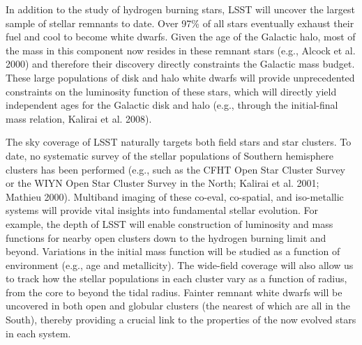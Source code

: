 \documentclass{emulateapj}
\begin{document}
In addition to the study of hydrogen burning stars, LSST will uncover the largest 
sample of stellar remnants to date. Over 97\% of all stars eventually exhaust their 
fuel and cool to become white dwarfs. Given the age of the Galactic halo, most of 
the mass in this component now resides in these remnant stars (e.g., Alcock et al. 
2000) and therefore their discovery directly constraints the Galactic mass budget.  
These large populations of disk and halo white dwarfs will provide unprecedented 
constraints on the luminosity function of these stars, which will directly yield 
independent ages for the Galactic disk and halo (e.g., through the initial-final mass 
relation, Kalirai et al. 2008).

The sky coverage of LSST naturally targets both field stars and star clusters.  
To date, no systematic survey of the stellar populations of Southern hemisphere clusters 
has been performed (e.g., such as the CFHT Open Star Cluster Survey or the WIYN Open 
Star Cluster Survey in the North; Kalirai et al. 2001; Mathieu 2000).  
Multiband imaging of these co-eval, co-spatial, and iso-metallic systems will provide 
vital insights into fundamental stellar evolution.  For example, the depth of 
LSST will enable construction of  luminosity and mass functions for nearby open clusters 
down to the hydrogen burning limit and beyond.  Variations in the initial mass function will be 
studied as a function of environment (e.g., age and metallicity).  The wide-field 
coverage will also allow us to track how the stellar populations in each cluster vary 
as a function of radius, from the core to beyond the tidal radius. Fainter remnant 
white dwarfs will be uncovered in both open and globular clusters (the nearest of which 
are all in the South), thereby providing a crucial link to the properties of the now 
evolved stars in each system. 
\end{document}
